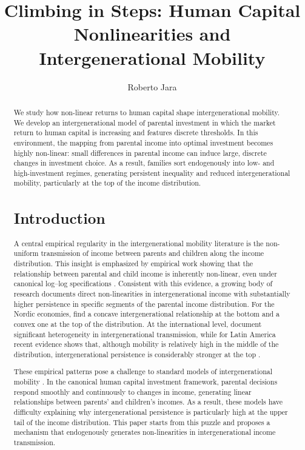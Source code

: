 \documentclass[12pt]{article}
\begin{document}
\title{Climbing in Steps: Human Capital Nonlinearities and Intergenerational Mobility }
\author{Roberto Jara}
\maketitle 

\begin{abstract}
We study how non-linear returns to human capital shape intergenerational mobility. We develop an intergenerational model of parental investment in which the market return to human capital is increasing and features discrete thresholds. In this environment, the mapping from parental income into optimal investment becomes highly non-linear: small differences in parental income can induce large, discrete changes in investment choice. As a result, families sort endogenously into low- and high-investment regimes, generating persistent inequality and reduced intergenerational mobility, particularly at the top of the income distribution. 
\section{Introduction}

A central empirical regularity in the intergenerational mobility literature is the non-uniform transmission of income between parents and children along the income distribution. This insight is emphasized by empirical work showing that the relationship between parental and child income is inherently non-linear, even under canonical log–log specifications \parencite{Chetty_2014}. Consistent with this evidence, a growing body of research documents direct non-linearities in intergenerational income with substantially higher persistence in specific segments of the parental income distribution. For the Nordic economies, \textcite{Bratsberg_2007} find a concave intergenerational relationship at the bottom and a convex one at the top of the distribution. At the international level, \textcite{Berritela_2016} document significant heterogeneity in intergenerational transmission, while for Latin America recent evidence shows that, although mobility is relatively high in the middle of the distribution, intergenerational persistence is considerably stronger at the top \parencite{Leites_2022,Cortes_2024,Britto_2022}.

These empirical patterns pose a challenge to standard models of intergenerational mobility \parencite{Becker_Tomes_1979,Solon_1999,Solon_2004}. In the canonical human capital investment framework, parental decisions respond smoothly and continuously to changes in income, generating  linear relationships between parents’ and children’s incomes. As a result, these models have difficulty explaining why intergenerational persistence is particularly high at the upper tail of the income distribution. This paper starts from this puzzle and proposes a mechanism that endogenously generates non-linearities in intergenerational income transmission.


\end{abstract}
\end{document}

